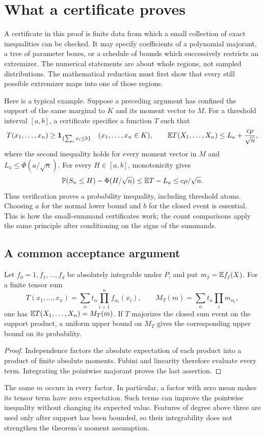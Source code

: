 \section{What a certificate proves}
\label{j:cert:section}

A certificate in this proof is finite data from which a small collection
of exact inequalities can be checked. It may specify coefficients of a
polynomial majorant, a tree of parameter boxes, or a schedule of bounds
which successively restricts an extremizer. The numerical statements are
about whole regions, not sampled distributions. The mathematical
reduction must first show that every still possible extremizer maps into
one of those regions.

Here is a typical example. Suppose a preceding argument has confined the
support of the same marginal to $K$ and its moment vector to $M$.
For a threshold interval $[a,b]$, a certificate specifies a function $T$
such that
\[
 T(x_1,\ldots,x_n)\ge\mathbf1_{\{\sum_i x_i\le b\}}
 \quad(x_1,\ldots,x_n\in K),\qquad
 \mathbb E T(X_1,\ldots,X_n)\le L_a+\frac{c\rho}{\sqrt n},
\]
where the second inequality holds for every moment vector in $M$ and
$L_a\le\Phi(a/\sqrt n)$. For every $H\in[a,b]$, monotonicity gives
\[
 \mathbb P(S_n\le H)-\Phi(H/\sqrt n)
 \le\mathbb E T-L_a\le c\rho/\sqrt n.
\]
Thus verification proves a probability inequality, including threshold
atoms. Choosing $a$ for the normal lower bound and $b$ for the closed
event is essential. This is how the small-summand certificates work;
the count comparisons apply the same principle after conditioning on
the signs of the summands.

\subsection{A common acceptance argument}

\begin{lemma}\label{j:cert:tensor}
Let $f_0=1,f_1,\ldots,f_d$ be absolutely integrable under $P$, and put
$m_j=\mathbb E f_j(X)$. For a finite tensor sum
\[
 T(x_1,\ldots,x_n)=\sum_\alpha t_\alpha
                         \prod_{i=1}^n f_{\alpha_i}(x_i),
 \qquad M_T(m)=\sum_\alpha t_\alpha\prod_i m_{\alpha_i},
\]
one has $\mathbb E T(X_1,\ldots,X_n)=M_T(m)$. If $T$ majorizes the
closed sum event on the support product, a uniform upper bound on
$M_T$ gives the corresponding upper bound on its probability.
\end{lemma}
\begin{proof}
Independence factors the absolute expectation of each product into a
product of finite absolute moments. Fubini and linearity therefore
evaluate every term. Integrating the pointwise majorant proves the
last assertion.
\end{proof}
The same $m$ occurs in every factor. In particular, a factor with zero
mean makes its tensor term have zero expectation. Such terms can improve
the pointwise inequality without changing its expected value. Features
of degree above three are used only after support has been bounded, so
their integrability does not strengthen the theorem's moment assumption.

